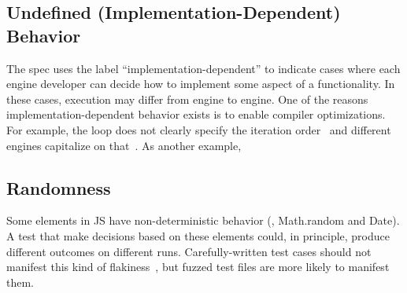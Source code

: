 \documentclass[10pt,conference,anonymous]{IEEEtran}
\begin{document}


\subsection{Undefined (Implementation-Dependent) Behavior}
\label{sec:imp-dep-behavior}


The \es{} spec uses the label ``implementation-dependent'' to indicate
cases where each engine developer can decide how to implement some
aspect of a functionality. In these cases, execution may differ from
engine to engine. One of the reasons implementation-dependent behavior
exists is to enable compiler optimizations. For example, the
 loop does not clearly specify the iteration
order~\cite{so-forin-undefined,javascript-in-chrome} and different
engines capitalize on that~\cite{for-in-undefined}. As another
example, 


\subsection{Randomness}

\sloppy Some elements in JS have non-deterministic behavior (\eg{},
Math.random and Date). A test that make decisions based on these
elements could, in principle, produce different outcomes on different
runs. Carefully-written test cases should not manifest this kind of
flakiness~\cite{luo-etal-fse2014,palomba-zaidman-icsme2017}, but
fuzzed test files are more likely to manifest them.
\end{document}
